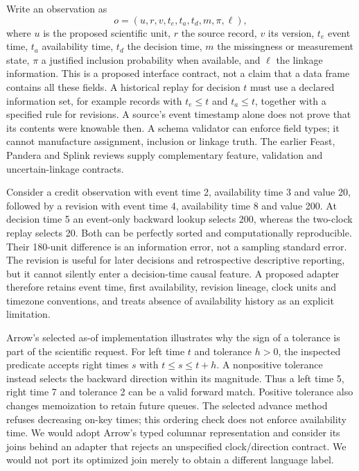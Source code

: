 Write an observation as
\[
 o=(u,r,v,t_e,t_a,t_d,m,\pi,\ell),
\]
where $u$ is the proposed scientific unit, $r$ the source record, $v$ its version, $t_e$ event time, $t_a$ availability time, $t_d$ the decision time, $m$ the missingness or measurement state, $\pi$ a justified inclusion probability when available, and $\ell$ the linkage information. This is a proposed interface contract, not a claim that a data frame contains all these fields. A historical replay for decision $t$ must use a declared information set, for example records with $t_e\leq t$ and $t_a\leq t$, together with a specified rule for revisions. A source's event timestamp alone does not prove that its contents were knowable then. A schema validator can enforce field types; it cannot manufacture assignment, inclusion or linkage truth. The earlier Feast, Pandera and Splink reviews supply complementary feature, validation and uncertain-linkage contracts.\citep{exec19_feast_source,exec19_feast_reference,exec24_pandera_source,exec24_pandera_reference,exec24_splink_sources,exec24_splink_contract,exec25_dww_choice}

Consider a credit observation with event time 2, availability time 3 and value 20, followed by a revision with event time 4, availability time 8 and value 200. At decision time 5 an event-only backward lookup selects 200, whereas the two-clock replay selects 20. Both can be perfectly sorted and computationally reproducible. Their 180-unit difference is an information error, not a sampling standard error. The revision is useful for later decisions and retrospective descriptive reporting, but it cannot silently enter a decision-time causal feature. A proposed adapter therefore retains event time, first availability, revision lineage, clock units and timezone conventions, and treats absence of availability history as an explicit limitation.\citep{exec25_dww_choice}

Arrow's selected as-of implementation illustrates why the sign of a tolerance is part of the scientific request. For left time $t$ and tolerance $h>0$, the inspected predicate accepts right times $s$ with $t\leq s\leq t+h$. A nonpositive tolerance instead selects the backward direction within its magnitude. Thus a left time 5, right time 7 and tolerance 2 can be a valid forward match. Positive tolerance also changes memoization to retain future queues. The selected advance method refuses decreasing on-key times; this ordering check does not enforce availability time. We would adopt Arrow's typed columnar representation and consider its joins behind an adapter that rejects an unspecified clock/direction contract. We would not port its optimized join merely to obtain a different language label.\citep{exec25_dww_arrow,exec25_dww_choice}

